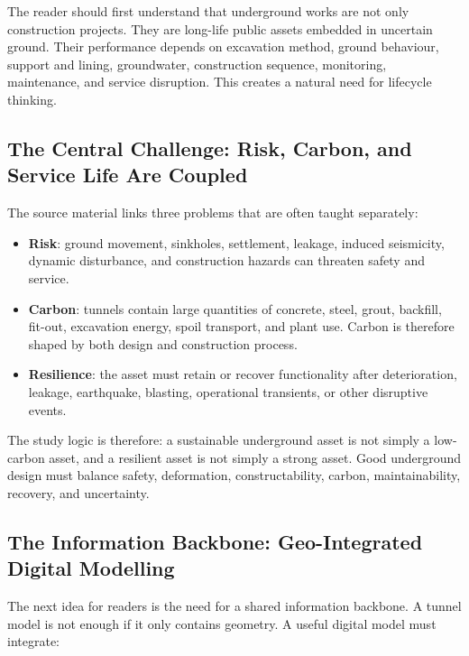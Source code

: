 \documentclass[11pt]{article}
\begin{document}
The reader should first understand that underground works are not only
construction projects. They are long-life public assets embedded in uncertain
ground. Their performance depends on excavation method, ground behaviour,
support and lining, groundwater, construction sequence, monitoring, maintenance,
and service disruption. This creates a natural need for lifecycle thinking.

\subsection{The Central Challenge: Risk, Carbon, and Service Life Are Coupled}

The source material links three problems that are often taught separately:

\begin{itemize}
  \item \textbf{Risk}: ground movement, sinkholes, settlement, leakage, induced
  seismicity, dynamic disturbance, and construction hazards can threaten safety
  and service.
  \item \textbf{Carbon}: tunnels contain large quantities of concrete, steel,
  grout, backfill, fit-out, excavation energy, spoil transport, and plant use.
  Carbon is therefore shaped by both design and construction process.
  \item \textbf{Resilience}: the asset must retain or recover functionality
  after deterioration, leakage, earthquake, blasting, operational transients, or
  other disruptive events.
\end{itemize}

The study logic is therefore: a sustainable underground asset is not simply a
low-carbon asset, and a resilient asset is not simply a strong asset. Good
underground design must balance safety, deformation, constructability, carbon,
maintainability, recovery, and uncertainty.

\subsection{The Information Backbone: Geo-Integrated Digital Modelling}

The next idea for readers is the need for a shared information backbone. A
tunnel model is not enough if it only contains geometry. A useful digital model
must integrate:
\end{document}
